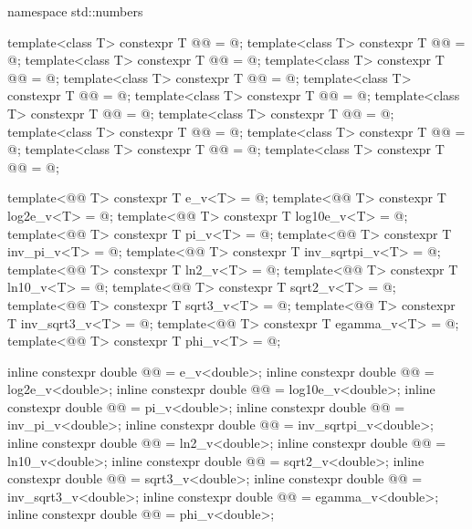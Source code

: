 %
\begin{codeblock}
namespace std::numbers {
  template<class T> constexpr T @@          = @\unspec@;
  template<class T> constexpr T @@      = @\unspec@;
  template<class T> constexpr T @@     = @\unspec@;
  template<class T> constexpr T @@         = @\unspec@;
  template<class T> constexpr T @@     = @\unspec@;
  template<class T> constexpr T @@ = @\unspec@;
  template<class T> constexpr T @@        = @\unspec@;
  template<class T> constexpr T @@       = @\unspec@;
  template<class T> constexpr T @@      = @\unspec@;
  template<class T> constexpr T @@      = @\unspec@;
  template<class T> constexpr T @@  = @\unspec@;
  template<class T> constexpr T @@     = @\unspec@;
  template<class T> constexpr T @@        = @\unspec@;

  template<@@ T> constexpr T e_v<T>          = @\seebelow@;
  template<@@ T> constexpr T log2e_v<T>      = @\seebelow@;
  template<@@ T> constexpr T log10e_v<T>     = @\seebelow@;
  template<@@ T> constexpr T pi_v<T>         = @\seebelow@;
  template<@@ T> constexpr T inv_pi_v<T>     = @\seebelow@;
  template<@@ T> constexpr T inv_sqrtpi_v<T> = @\seebelow@;
  template<@@ T> constexpr T ln2_v<T>        = @\seebelow@;
  template<@@ T> constexpr T ln10_v<T>       = @\seebelow@;
  template<@@ T> constexpr T sqrt2_v<T>      = @\seebelow@;
  template<@@ T> constexpr T sqrt3_v<T>      = @\seebelow@;
  template<@@ T> constexpr T inv_sqrt3_v<T>  = @\seebelow@;
  template<@@ T> constexpr T egamma_v<T>     = @\seebelow@;
  template<@@ T> constexpr T phi_v<T>        = @\seebelow@;

  inline constexpr double @@          = e_v<double>;
  inline constexpr double @@      = log2e_v<double>;
  inline constexpr double @@     = log10e_v<double>;
  inline constexpr double @@         = pi_v<double>;
  inline constexpr double @@     = inv_pi_v<double>;
  inline constexpr double @@ = inv_sqrtpi_v<double>;
  inline constexpr double @@        = ln2_v<double>;
  inline constexpr double @@       = ln10_v<double>;
  inline constexpr double @@      = sqrt2_v<double>;
  inline constexpr double @@      = sqrt3_v<double>;
  inline constexpr double @@  = inv_sqrt3_v<double>;
  inline constexpr double @@     = egamma_v<double>;
  inline constexpr double @@        = phi_v<double>;
}
\end{codeblock}

